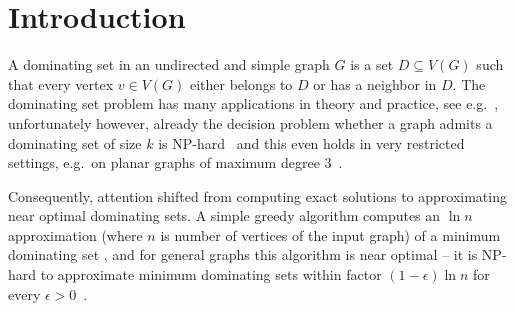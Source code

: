 
\section{Introduction}

A dominating set in an undirected and simple graph $G$ is a set
$D\subseteq V(G)$ such that every vertex $v\in V(G)$ either belongs
to $D$ or has a neighbor in $D$.
The dominating set problem has many
applications in theory and practice, see e.g.~\cite{du2012connected,sasireka2014applications}, unfortunately
however, already the decision
problem whether a graph admits a dominating set of size $k$
is NP-hard~\cite{karp1972reducibility} and this even holds in
very restricted settings, e.g.\ on planar graphs of maximum degree
$3$~\cite{garey1979computers}.

Consequently, attention
shifted from computing exact solutions to approxi\-mating
near optimal dominating sets. A simple greedy algorithm computes
an $\ln n$ approximation (where $n$ is number of vertices
of the input graph)
of a minimum dominating set \cite{johnson1974approximation,lovasz1975ratio}, and for
general graphs this algorithm is near optimal -- it is NP-hard
to approximate minimum dominating sets within factor
$(1-\epsilon)\ln n$ for every $\epsilon>0$~\cite{dinur2014analytical}.

